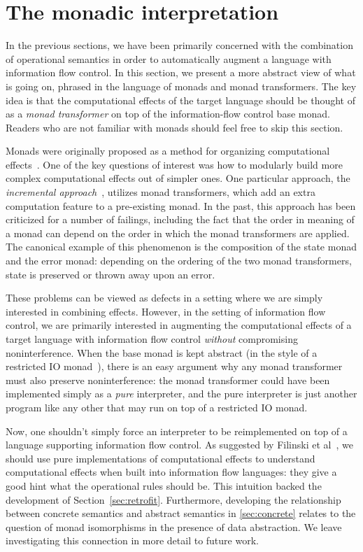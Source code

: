 \section{The monadic interpretation}
\label{sec:monad}

In the previous sections, we have been primarily concerned with the
combination of operational semantics in order to automatically augment a
language with information flow control.  In this section, we present
a more abstract view of what is going on, phrased in the language of monads
and monad transformers.  The key idea is that the computational effects
of the target language should be thought of as a \emph{monad transformer}
on top of the information-flow control base monad.  Readers who are not
familiar with monads should feel free to skip this section.

Monads were originally proposed as a method for organizing computational
effects~\cite{Moggi:1991:NCM:116981.116984}.  One of the key questions
of interest was how to modularly build more complex computational
effects out of simpler ones.  One particular approach, the
\emph{incremental
approach}~\cite{Benton00monadsand,Liang95monadtransformers}, utilizes
monad transformers, which add an extra computation feature to a
pre-existing monad.  In the past, this approach has been criticized for
a number of failings, including the fact that the order in meaning of a
monad can depend on the order in which the monad transformers are
applied. The canonical example of this phenomenon is the
composition of the state monad and the error monad: depending on the
ordering of the two monad transformers, state is preserved or thrown away
upon an error.

These problems can be viewed as defects in a setting where we are
simply interested in combining effects.  However, in the setting of information
flow control, we are primarily interested in augmenting the
computational effects of a target language with information flow control
\emph{without} compromising noninterference.  When the base monad is
kept abstract (in the style of a restricted IO monad~\cite{Terei:2012:SH:2364506.2364524}),
there is an easy argument why any monad transformer must also preserve noninterference:
the monad transformer could have been implemented simply as a \emph{pure} interpreter, and
the pure interpreter is just another program like any other that may run on top of
a restricted IO monad.

Now, one shouldn't simply force an interpreter to be reimplemented on
top of a language supporting information flow control.  As suggested by
Filinski et al~\cite{Filinski:2010:MA:1707801.1706354}, we should use
pure implementations of computational effects to understand
computational effects when built into information flow languages: they
give a good hint what the operational rules should be.  This intuition
backed the development of Section~\ref{sec:retrofit}.  Furthermore,
developing the relationship between concrete semantics and abstract
semantics in \ref{sec:concrete} relates to the question of monad
isomorphisms in the presence of data abstraction.  We leave
investigating this connection in more detail to future work.
